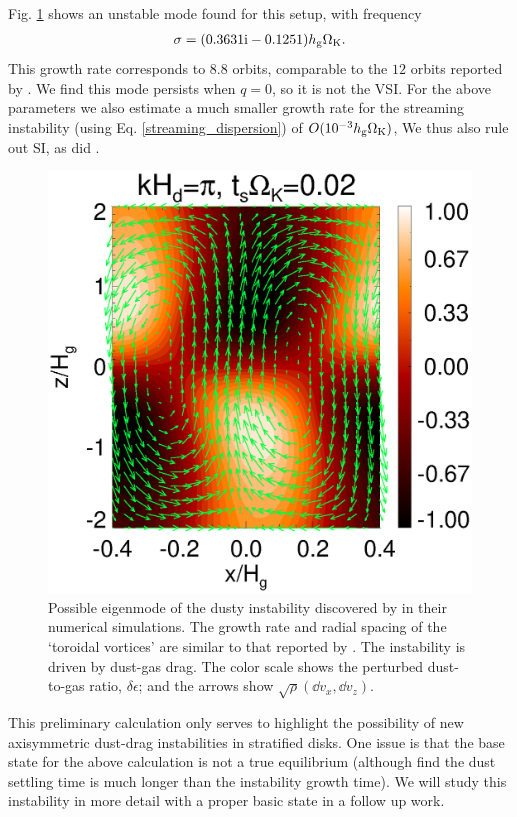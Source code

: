 Fig. \ref{result2d_loren} shows an unstable mode found for this setup,
with  
frequency 
\begin{align*}
\sigma = (0.3631\mathrm{i} - 0.1251)h_\mathrm{g}\Omega_{\rm K}. 
\end{align*}
This growth rate corresponds to $8.8$ orbits, comparable to the $12$
orbits reported by \citeauthor{loren15}. We find this mode 
persists when $q=0$, so it is not the VSI.  For the above parameters
we also estimate a much smaller growth
rate for the streaming instability (using
Eq. \ref{streaming_dispersion}) of 
$O(10^{-3}h_\mathrm{g}\Omega_{\rm K})$, We thus also rule out
SI, as did \citeauthor{loren15}. 

\begin{figure}
  \includegraphics[width=\linewidth]{figures/result2d_loren.ps}
  \caption{Possible eigenmode of the dusty instability discovered by 
    \cite{loren15} in their numerical simulations. The growth rate and 
    radial spacing of the `toroidal vortices' are similar to that
    reported by \citeauthor{loren15}. The instability is driven by
    dust-gas drag. The color scale shows the
    perturbed  
    dust-to-gas ratio, $\delta\epsilon$; and the arrows show
    $\sqrt{\rho}\left(\dd v_x, \dd v_z\right)$.
    \label{result2d_loren}
  }
\end{figure}

This preliminary calculation only serves to highlight the possibility
of new axisymmetric dust-drag instabilities in stratified disks. One 
issue is that the base state for the above calculation is not a true
equilibrium (although \citeauthor {loren15} find the dust settling
time is much longer than the instability growth time). We will study
this instability in more detail with a proper basic
state in a follow up work.  

